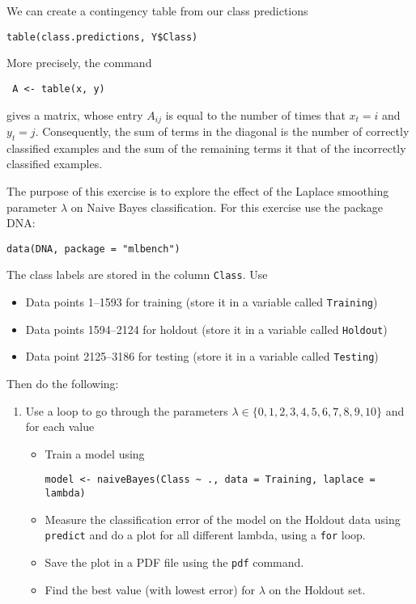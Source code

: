 We can create a contingency table from our class predictions
\begin{lstlisting}
table(class.predictions, Y$Class) 
\end{lstlisting}
More precisely, the command
\begin{lstlisting}
 A <- table(x, y)
\end{lstlisting}
gives a matrix, whose entry $A_{ij}$ is equal to the number of times
that $x_t = i$ and $y_t = j$. Consequently, the sum of terms in the diagonal is the number of correctly classified examples and the sum of the remaining terms it that of the incorrectly classified examples.


\begin{exercise}
  The purpose of this exercise is to explore the effect of the Laplace smoothing parameter $\lambda$ on Naive Bayes classification. For this exercise use the package DNA:
\begin{lstlisting}
data(DNA, package = "mlbench")
\end{lstlisting}
  The class labels are stored in the column \texttt{Class}. Use
  \begin{itemize}
  \item Data points 1--1593 for training (store it in a variable called \texttt{Training})
  \item Data points 1594--2124 for holdout (store it in a variable called \texttt{Holdout})
  \item Data point 2125--3186 for testing  (store it in a variable called \texttt{Testing})
  \end{itemize}
  Then do the following:
  \begin{enumerate}
  \item Use a loop to go through the parameters $\lambda  \in \{0, 1, 2, 3, 4, 5, 6, 7, 8, 9, 10\}$ and for each value
    \begin{itemize}
    \item Train a model using 
\begin{lstlisting}
model <- naiveBayes(Class ~ ., data = Training, laplace = lambda)
\end{lstlisting}
    \item Measure the classification error of the model on the Holdout data using \texttt{predict} and do a plot for all different lambda, using a \texttt{for} loop.
    \item Save the plot in a PDF file using the \texttt{pdf} command.
    \item Find the best value (with lowest error) for $\lambda$ on the Holdout set.

\end{itemize}
\end{enumerate}
\end{exercise}

